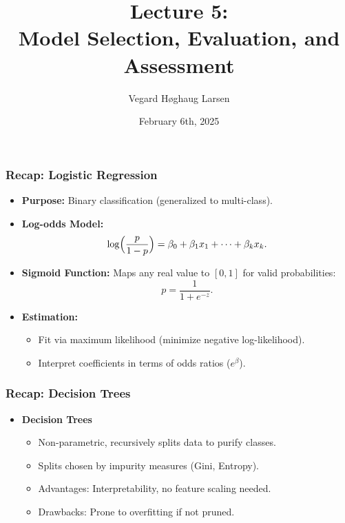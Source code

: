 \documentclass[aspectratio=169]{beamer}
\title{Lecture 5:\\ Model Selection, Evaluation, and Assessment}
\institute{GRA4160: Predictive Modelling with Machine Learning}
\date{February 6th, 2025}
\author{Vegard H\o ghaug Larsen}
\begin{document}
\maketitle


\begin{frame}
\frametitle{Recap: Logistic Regression}
\begin{itemize}
    \item \textbf{Purpose:} Binary classification (generalized to multi-class).
    \item \textbf{Log-odds Model:} 
    \[
      \log\Bigl(\frac{p}{1-p}\Bigr) = \beta_0 + \beta_1 x_1 + \cdots + \beta_k x_k.
    \]
    \item \textbf{Sigmoid Function:} Maps any real value to \([0,1]\) for valid probabilities:
    \[
      p = \frac{1}{1 + e^{-z}}.
    \]
    \item \textbf{Estimation:} 
      \begin{itemize}
        \item Fit via maximum likelihood (minimize negative log-likelihood).
        \item Interpret coefficients in terms of odds ratios (\(e^\beta\)).
      \end{itemize}
\end{itemize}
\end{frame}


\begin{frame}
\frametitle{Recap: Decision Trees}
\begin{itemize}
    \item \textbf{Decision Trees}
    \begin{itemize}
        \item Non-parametric, recursively splits data to purify classes.
        \item Splits chosen by impurity measures (Gini, Entropy).
        \item Advantages: Interpretability, no feature scaling needed.
        \item Drawbacks: Prone to overfitting if not pruned.
    \end{itemize}
\end{itemize}
\end{frame}
\end{document}
